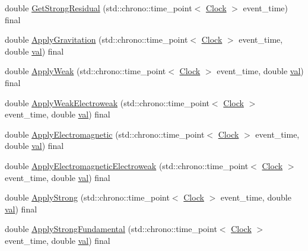\begin{DoxyCompactItemize}
\item 
double \mbox{\hyperlink{class_monomer_a3b00168520f592098356f7cd3e663ad3}{Get\+Strong\+Residual}} (std\+::chrono\+::time\+\_\+point$<$ \mbox{\hyperlink{universe_8h_a0ef8d951d1ca5ab3cfaf7ab4c7a6fd80}{Clock}} $>$ event\+\_\+time) final
\item 
double \mbox{\hyperlink{class_monomer_a8747945cc2f7abd7ce0885345ad14ebc}{Apply\+Gravitation}} (std\+::chrono\+::time\+\_\+point$<$ \mbox{\hyperlink{universe_8h_a0ef8d951d1ca5ab3cfaf7ab4c7a6fd80}{Clock}} $>$ event\+\_\+time, double \mbox{\hyperlink{glad_8h_a26942fd2ed566ef553eae82d2c109c8f}{val}}) final
\item 
double \mbox{\hyperlink{class_monomer_a176a1a4dfed1eaddc6637bbfd2660aba}{Apply\+Weak}} (std\+::chrono\+::time\+\_\+point$<$ \mbox{\hyperlink{universe_8h_a0ef8d951d1ca5ab3cfaf7ab4c7a6fd80}{Clock}} $>$ event\+\_\+time, double \mbox{\hyperlink{glad_8h_a26942fd2ed566ef553eae82d2c109c8f}{val}}) final
\item 
double \mbox{\hyperlink{class_monomer_a64f65c128ebc2428c42739c930696ea1}{Apply\+Weak\+Electroweak}} (std\+::chrono\+::time\+\_\+point$<$ \mbox{\hyperlink{universe_8h_a0ef8d951d1ca5ab3cfaf7ab4c7a6fd80}{Clock}} $>$ event\+\_\+time, double \mbox{\hyperlink{glad_8h_a26942fd2ed566ef553eae82d2c109c8f}{val}}) final
\item 
double \mbox{\hyperlink{class_monomer_ae64dfbf82610ae26427be9c824aef70f}{Apply\+Electromagnetic}} (std\+::chrono\+::time\+\_\+point$<$ \mbox{\hyperlink{universe_8h_a0ef8d951d1ca5ab3cfaf7ab4c7a6fd80}{Clock}} $>$ event\+\_\+time, double \mbox{\hyperlink{glad_8h_a26942fd2ed566ef553eae82d2c109c8f}{val}}) final
\item 
double \mbox{\hyperlink{class_monomer_a4c3f9894ea57047789bec32602f033cb}{Apply\+Electromagnetic\+Electroweak}} (std\+::chrono\+::time\+\_\+point$<$ \mbox{\hyperlink{universe_8h_a0ef8d951d1ca5ab3cfaf7ab4c7a6fd80}{Clock}} $>$ event\+\_\+time, double \mbox{\hyperlink{glad_8h_a26942fd2ed566ef553eae82d2c109c8f}{val}}) final
\item 
double \mbox{\hyperlink{class_monomer_acba5091693082fdf2d28f1a5a4ae19a1}{Apply\+Strong}} (std\+::chrono\+::time\+\_\+point$<$ \mbox{\hyperlink{universe_8h_a0ef8d951d1ca5ab3cfaf7ab4c7a6fd80}{Clock}} $>$ event\+\_\+time, double \mbox{\hyperlink{glad_8h_a26942fd2ed566ef553eae82d2c109c8f}{val}}) final
\item 
double \mbox{\hyperlink{class_monomer_aa186454670f7796e196509238d419a35}{Apply\+Strong\+Fundamental}} (std\+::chrono\+::time\+\_\+point$<$ \mbox{\hyperlink{universe_8h_a0ef8d951d1ca5ab3cfaf7ab4c7a6fd80}{Clock}} $>$ event\+\_\+time, double \mbox{\hyperlink{glad_8h_a26942fd2ed566ef553eae82d2c109c8f}{val}}) final

\end{DoxyCompactItemize}

